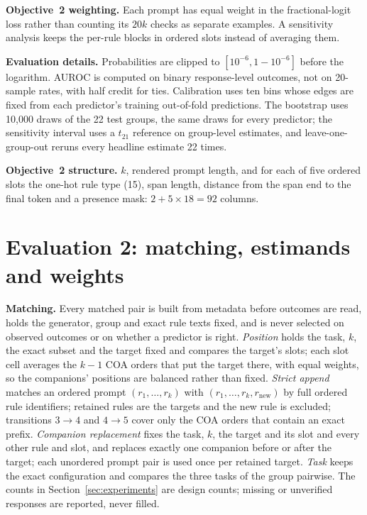 \documentclass{article}
\begin{document}
\textbf{Objective~2 weighting.} Each prompt has equal weight in the fractional-logit loss rather than counting its $20k$
checks as separate examples. A sensitivity analysis keeps the per-rule blocks in ordered slots instead of averaging them.

\textbf{Evaluation details.} Probabilities are clipped to $[10^{-6},1-10^{-6}]$ before the logarithm. AUROC is
computed on binary response-level outcomes, not on 20-sample rates, with half credit for ties. Calibration uses ten
bins whose edges are fixed from each predictor's training out-of-fold predictions. The bootstrap uses 10,000 draws of
the 22 test groups, the same draws for every predictor; the sensitivity interval uses a $t_{21}$ reference on
group-level estimates, and leave-one-group-out reruns every headline estimate 22 times.

\textbf{Objective~2 structure.} $k$, rendered prompt length, and for each of five ordered slots the one-hot rule type
(15), span length, distance from the span end to the final token and a presence mask: $2+5\times18=92$ columns.

\section{Evaluation 2: matching, estimands and weights}
\label{app:eval2}

\textbf{Matching.} Every matched pair is built from metadata before outcomes are read, holds the generator, group and
exact rule texts fixed, and is never selected on observed outcomes or on whether a predictor is right. \emph{Position}
holds the task, $k$, the exact subset and the target fixed and compares the target's slots; each slot cell averages the
$k-1$ COA orders that put the target there, with equal weights, so the companions' positions are balanced rather than
fixed. \emph{Strict append} matches an ordered prompt $(r_1,\dots,r_k)$ with $(r_1,\dots,r_k,r_{\text{new}})$ by full
ordered rule identifiers; retained rules are the targets and the new rule is excluded; transitions $3\to4$ and
$4\to5$ cover only the COA orders that contain an exact prefix. \emph{Companion replacement} fixes the task, $k$, the
target and its slot and every other rule and slot, and replaces exactly one companion before or after the target; each
unordered prompt pair is used once per retained target. \emph{Task} keeps the exact configuration and compares the
three tasks of the group pairwise. The counts in Section~\ref{sec:experiments} are design counts; missing or
unverified responses are reported, never filled.
\end{document}
